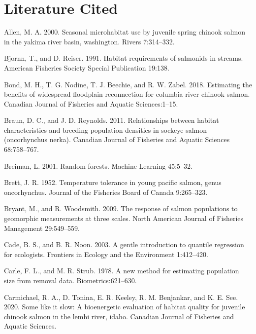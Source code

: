 \documentclass[
  12pt,
]{article}
\begin{document}
\newpage

\hypertarget{literature-cited}{%
\section{Literature Cited}\label{literature-cited}}

\hypertarget{refs}{}
\leavevmode\hypertarget{ref-Allen2000}{}%
Allen, M. A. 2000. Seasonal microhabitat use by juvenile spring chinook salmon in the yakima river basin, washington. Rivers 7:314--332.

\leavevmode\hypertarget{ref-Bjornn1991}{}%
Bjornn, T., and D. Reiser. 1991. Habitat requirements of salmonids in streams. American Fisheries Society Special Publication 19:138.

\leavevmode\hypertarget{ref-Bond2018}{}%
Bond, M. H., T. G. Nodine, T. J. Beechie, and R. W. Zabel. 2018. Estimating the benefits of widespread floodplain reconnection for columbia river chinook salmon. Canadian Journal of Fisheries and Aquatic Sciences:1--15.

\leavevmode\hypertarget{ref-Braun2011}{}%
Braun, D. C., and J. D. Reynolds. 2011. Relationships between habitat characteristics and breeding population densities in sockeye salmon (oncorhynchus nerka). Canadian Journal of Fisheries and Aquatic Sciences 68:758--767.

\leavevmode\hypertarget{ref-Breiman2001}{}%
Breiman, L. 2001. Random forests. Machine Learning 45:5--32.

\leavevmode\hypertarget{ref-Brett1952}{}%
Brett, J. R. 1952. Temperature tolerance in young pacific salmon, genus oncorhynchus. Journal of the Fisheries Board of Canada 9:265--323.

\leavevmode\hypertarget{ref-Bryant2009}{}%
Bryant, M., and R. Woodsmith. 2009. The response of salmon populations to geomorphic measurements at three scales. North American Journal of Fisheries Management 29:549--559.

\leavevmode\hypertarget{ref-Cade2003}{}%
Cade, B. S., and B. R. Noon. 2003. A gentle introduction to quantile regression for ecologists. Frontiers in Ecology and the Environment 1:412--420.

\leavevmode\hypertarget{ref-Carle1978}{}%
Carle, F. L., and M. R. Strub. 1978. A new method for estimating population size from removal data. Biometrics:621--630.

\leavevmode\hypertarget{ref-Carmichael2020}{}%
Carmichael, R. A., D. Tonina, E. R. Keeley, R. M. Benjankar, and K. E. See. 2020. Some like it slow: A bioenergetic evaluation of habitat quality for juvenile chinook salmon in the lemhi river, idaho. Canadian Journal of Fisheries and Aquatic Sciences.
\end{document}
